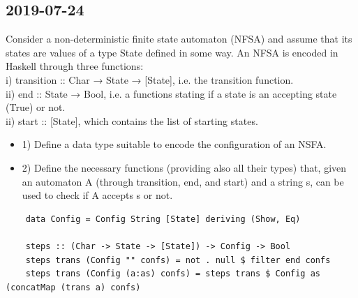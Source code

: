 \subsection{2019-07-24}
Consider a non-deterministic finite state automaton (NFSA) and assume that its states are values of a type
State defined in some way. An NFSA is encoded in Haskell through three functions: \\
i) transition :: Char → State → [State], i.e. the transition function. \\
ii) end :: State → Bool, i.e. a functions stating if a state is an accepting state (True) or not. \\
ii) start :: [State], which contains the list of starting states. \\
\begin{itemize}
    \item 1) Define a data type suitable to encode the configuration of an NSFA.
    \item 2) Define the necessary functions (providing also all their types) that, given an automaton A (through transition, end, and start) and a string s, can be used to check if A accepts s or not.
\end{itemize}
\begin{lstlisting}
    data Config = Config String [State] deriving (Show, Eq)

    steps :: (Char -> State -> [State]) -> Config -> Bool
    steps trans (Config "" confs) = not . null $ filter end confs
    steps trans (Config (a:as) confs) = steps trans $ Config as (concatMap (trans a) confs)
\end{lstlisting}

